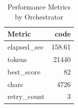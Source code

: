 \begin{table}[t]
\centering
\caption{Performance Metrics by Orchestrator}
\label{tab:perf_main}
\begin{tabular}{lr}
\toprule
Metric & code \\
\midrule
elapsed\_sec & 158.61 \\
tokens & 21440 \\
best\_score & 82 \\
chars & 4726 \\
retry\_count & 3 \\
\bottomrule
\end{tabular}
\end{table}
